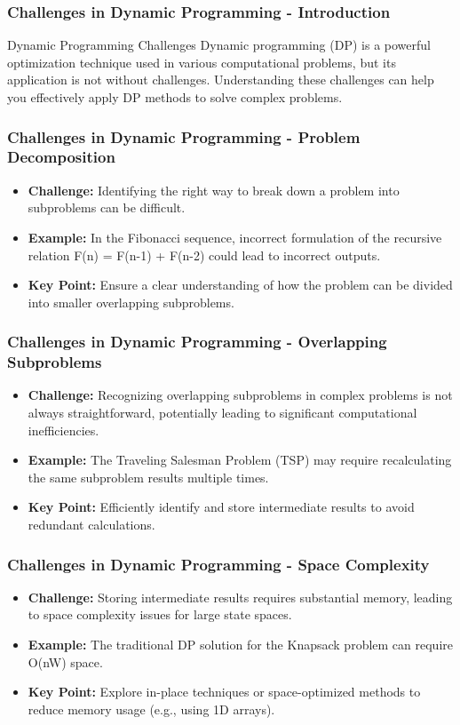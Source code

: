\documentclass[aspectratio=169]{beamer}
\begin{document}
\begin{frame}[fragile]
    \frametitle{Challenges in Dynamic Programming - Introduction}
    \begin{block}{Dynamic Programming Challenges}
        Dynamic programming (DP) is a powerful optimization technique used in various computational problems, but its application is not without challenges. Understanding these challenges can help you effectively apply DP methods to solve complex problems.
    \end{block}
\end{frame}

\begin{frame}[fragile]
    \frametitle{Challenges in Dynamic Programming - Problem Decomposition}
    \begin{itemize}
        \item \textbf{Challenge:} Identifying the right way to break down a problem into subproblems can be difficult. 
        \item \textbf{Example:} In the Fibonacci sequence, incorrect formulation of the recursive relation F(n) = F(n-1) + F(n-2) could lead to incorrect outputs.
        \item \textbf{Key Point:} Ensure a clear understanding of how the problem can be divided into smaller overlapping subproblems.
    \end{itemize}
\end{frame}

\begin{frame}[fragile]
    \frametitle{Challenges in Dynamic Programming - Overlapping Subproblems}
    \begin{itemize}
        \item \textbf{Challenge:} Recognizing overlapping subproblems in complex problems is not always straightforward, potentially leading to significant computational inefficiencies.
        \item \textbf{Example:} The Traveling Salesman Problem (TSP) may require recalculating the same subproblem results multiple times.
        \item \textbf{Key Point:} Efficiently identify and store intermediate results to avoid redundant calculations.
    \end{itemize}
\end{frame}

\begin{frame}[fragile]
    \frametitle{Challenges in Dynamic Programming - Space Complexity}
    \begin{itemize}
        \item \textbf{Challenge:} Storing intermediate results requires substantial memory, leading to space complexity issues for large state spaces.
        \item \textbf{Example:} The traditional DP solution for the Knapsack problem can require O(nW) space.
        \item \textbf{Key Point:} Explore in-place techniques or space-optimized methods to reduce memory usage (e.g., using 1D arrays).
    \end{itemize}
\end{frame}
\end{document}
